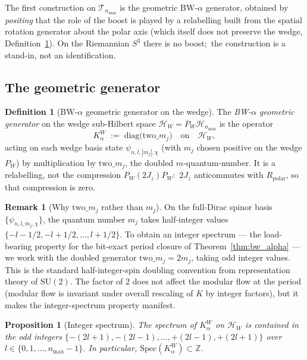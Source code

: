 \documentclass[11pt,a4paper]{article}
\theoremstyle{plain}
\newtheorem{proposition}[theorem]{Proposition}
\theoremstyle{definition}
\newtheorem{definition}[theorem]{Definition}
\newtheorem{remark}[theorem]{Remark}
\newcommand{\nmax}{n_{\max}}
\newcommand{\sthree}{S^{3}}
\newcommand{\Hilb}{\mathcal{H}}
\newcommand{\Tcal}{\mathcal{T}}
\newcommand{\Z}{\mathbb{Z}}
\newcommand{\SU}{\mathrm{SU}}
\begin{document}
The first construction on $\Tcal_{\nmax}$ is the geometric
BW-$\alpha$ generator, obtained by \emph{positing} that the role of the
boost is played by a relabelling built from the spatial rotation
generator about the polar axis (which itself does not preserve the
wedge, Definition~\ref{def:K_alpha_W}).  On the Riemannian $\sthree$
there is no boost;\ the construction is a stand-in, not an identification.

\subsection{The geometric generator}\label{sec:K_alpha_W}

\begin{definition}[BW-$\alpha$ geometric generator on the wedge]
\label{def:K_alpha_W}
The \emph{BW-$\alpha$ geometric generator} on the wedge sub-Hilbert
space $\Hilb_W = P_W \Hilb_{\nmax}$ is the operator
\begin{equation}\label{eq:K_alpha_W_def}
   K_\alpha^W \;:=\; \mathrm{diag}\bigl(\mathrm{two}\_m_j\bigr)
   \quad \text{on} \quad \Hilb_W,
\end{equation}
acting on each wedge basis state $\psi_{n, l, |m_j|, \chi}$ (with
$m_j$ chosen positive on the wedge $P_W$) by multiplication by
$\mathrm{two}\_m_j$, the doubled $m$-quantum-number.  It is a
relabelling, not the compression $P_W (2J_z) P_W$:\ $2J_z$ anticommutes
with $R_{\mathrm{polar}}$, so that compression is zero.
\end{definition}

\begin{remark}[Why $\mathrm{two}\_m_j$ rather than $m_j$]
\label{rem:two_m_j}
On the full-Dirac spinor basis $\{\psi_{n, l, m_j, \chi}\}$, the
quantum number $m_j$ takes half-integer values
$\{-l - 1/2, -l + 1/2, \ldots, l + 1/2\}$. To obtain an integer
spectrum --- the load-bearing property for the bit-exact period
closure of Theorem~\ref{thm:bw_alpha} --- we work with the doubled
generator $\mathrm{two}\_m_j = 2 m_j$, taking odd integer values.
This is the standard half-integer-spin doubling convention from
representation theory of $\SU(2)$. The factor of $2$ does not affect
the modular flow at the period (modular flow is invariant under
overall rescaling of $K$ by integer factors), but it makes the
integer-spectrum property manifest.
\end{remark}

\begin{proposition}[Integer spectrum]\label{prop:integer_spectrum}
The spectrum of $K_\alpha^W$ on $\Hilb_W$ is contained in the odd
integers $\{-(2l+1), -(2l-1), \ldots, +(2l-1), +(2l+1)\}$ over
$l \in \{0, 1, \ldots, \nmax - 1\}$. In particular,
$\mathrm{Spec}(K_\alpha^W) \subset \Z$.
\end{proposition}
\end{document}
